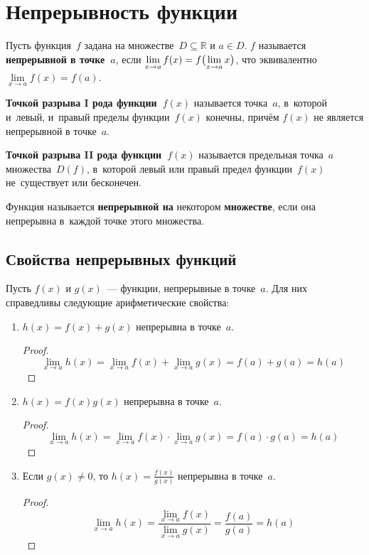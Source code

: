 \section{Непрерывность функции}
 Пусть функция~$f$ задана на множестве~$D \subseteq \mathbb R$ и $a \in D$.
$f$ называется \textbf{непрерывной в точке~$a$}, если $\lim\limits_{x \to a} f(x) \opbr= f \bigl( \lim\limits_{x \to a} x \bigr)$, что эквивалентно $\lim\limits_{x \to a} f(x) = f(a)$.

 \textbf{Точкой разрыва I рода функции~$f(x)$} называется точка~$a$, в~которой и~левый, и~правый пределы функции~$f(x)$ конечны, причём $f(x)$ не является непрерывной в точке~$a$.

\textbf{Точкой разрыва II рода функции~$f(x)$} называется предельная точка~$a$ множества~$D(f)$, в~которой левый или правый предел функции~$f(x)$ не~существует или бесконечен.

Функция называется \textbf{непрерывной на} некотором \textbf{множестве}, если она непрерывна в~каждой точке этого множества.

\subsection{Свойства непрерывных функций}
Пусть $f(x)$ и $g(x)$~--- функции, непрерывные в точке~$a$.
Для них справедливы следующие арифметические свойства:
\begin{enumerate}
	\item $h(x) = f(x) + g(x)$ непрерывна в точке~$a$.
	\begin{proof}
	\begin{equation*}
	\lim_{x \to a} h(x) =
	\lim_{x \to a} f(x) + \lim_{x \to a} g(x) =
	f(a) + g(a) =
	h(a)
	\end{equation*}
	\end{proof}
	
	\item $h(x) = f(x)g(x)$ непрерывна в точке~$a$.
	\begin{proof}
	\begin{equation*}
	\lim_{x \to a} h(x) =
	\lim_{x \to a} f(x) \cdot \lim_{x \to a} g(x) =
	f(a) \cdot g(a) =
	h(a)
	\end{equation*}
	\end{proof}
	
	\item Если $g(x) \neq 0$, то $h(x) = \frac{f(x)}{g(x)}$ непрерывна в точке~$a$.
	\begin{proof}
	\begin{equation*}
	\lim_{x \to a} h(x) =
	\frac{\displaystyle \lim_{x \to a} f(x)}{\displaystyle \lim_{x \to a} g(x)} =
	\frac{f(a)}{g(a)} =
	h(a)
	\end{equation*}
	\end{proof}
\end{enumerate}

